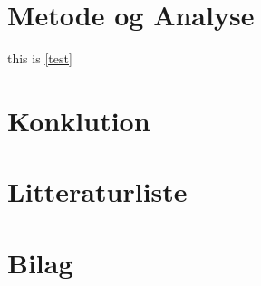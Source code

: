 \documentclass[12pt]{article}
\begin{document}
\section{Metode og Analyse}
this is \ref{test}
\section{Konklution}

\section{Litteraturliste}

\newpage
\section{Bilag}
\end{document}
